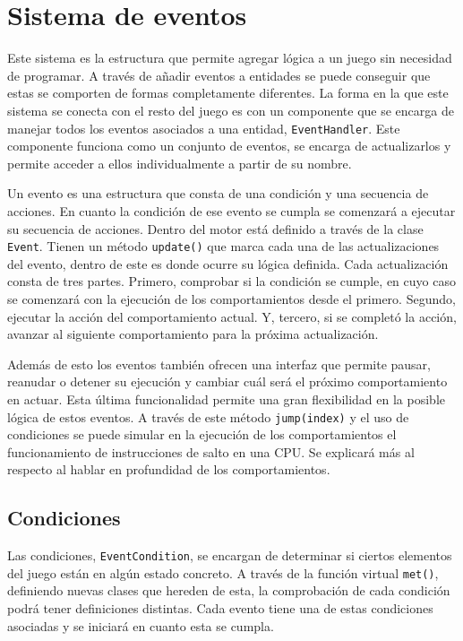 \section{Sistema de eventos}
\label{sec:eventos}
Este sistema es la estructura que permite agregar lógica a un juego sin necesidad de programar. A través de añadir eventos a entidades se puede conseguir que estas se comporten de formas completamente diferentes. La forma en la que este sistema se conecta con el resto del juego es con un componente que se encarga de manejar todos los eventos asociados a una entidad, \texttt{EventHandler}. Este componente funciona como un conjunto de eventos, se encarga de actualizarlos y permite acceder a ellos individualmente a partir de su nombre.

\medskip

Un evento es una estructura que consta de una condición y una secuencia de acciones. En cuanto la condición de ese evento se cumpla se comenzará a ejecutar su secuencia de acciones. Dentro del motor está definido a través de la clase \texttt{Event}. Tienen un método \texttt{update()} que marca cada una de las actualizaciones del evento, dentro de este es donde ocurre su lógica definida. Cada actualización consta de tres partes. Primero, comprobar si la condición se cumple, en cuyo caso se comenzará con la ejecución de los comportamientos desde el primero. Segundo, ejecutar la acción del comportamiento actual. Y, tercero, si se completó la acción, avanzar al siguiente comportamiento para la próxima actualización. 

\medskip

Además de esto los eventos también ofrecen una interfaz que permite pausar, reanudar o detener su ejecución y cambiar cuál será el próximo comportamiento en actuar. Esta última funcionalidad permite una gran flexibilidad en la posible lógica de estos eventos. A través de este método \texttt{jump(index)} y el uso de condiciones se puede simular en la ejecución de los comportamientos el funcionamiento de instrucciones de salto en una CPU. Se explicará más al respecto al hablar en profundidad de los comportamientos. 


\subsection{Condiciones}
Las condiciones, \texttt{EventCondition}, se encargan de determinar si ciertos elementos del juego están en algún estado concreto. A través de la función virtual \texttt{met()}, definiendo nuevas clases que hereden de esta, la comprobación de cada condición podrá tener definiciones distintas. Cada evento tiene una de estas condiciones asociadas y se iniciará en cuanto esta se cumpla. 

